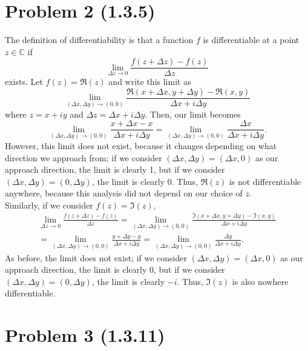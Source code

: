 \documentclass{article}
\begin{document}
\section{Problem 2 (1.3.5)} 
The definition of differentiability is that a function $f$ is differentiable at a point $z\in\mathbb{C}$ if 
\begin{equation*}
    \lim_{\Delta z \to 0}\frac{f(z+\Delta z)-f(z)}{\Delta z}
\end{equation*}
exists. Let $f(z)=\Re(z)$ and write this limit as 
\begin{equation*}
    \lim_{(\Delta x,\Delta y) \to (0,0)}\frac{\Re(x+\Delta x,y+\Delta y)-\Re(x,y)}{\Delta x + i \Delta y}
\end{equation*}
where $z=x+iy$ and $\Delta z= \Delta x+i\Delta y$. Then, our limit becomes
\begin{equation*}
    \lim_{(\Delta x,\Delta y) \to (0,0)}\frac{x+\Delta x-x}{\Delta x + i \Delta y} = \lim_{(\Delta x,\Delta y) \to (0,0)}\frac{\Delta x}{\Delta x + i \Delta y}.
\end{equation*}
However, this limit does not exist, because it changes depending on what direction we approach from; if we consider $(\Delta x,\Delta y)=(\Delta x, 0)$ as our approach direction, the limit is clearly 1, but if we consider $(\Delta x,\Delta y)=(0, \Delta y)$, the limit is clearly 0. Thus, $\Re(z)$ is not differentiable anywhere, because this analysis did not depend on our choice of $z$. \\
Similarly, if we consider $f(z)=\Im(z)$, 
\begin{equation*}
\begin{split}
    \lim_{\Delta z \to 0}\frac{f(z+\Delta z)-f(z)}{\Delta z} = \lim_{(\Delta x,\Delta y) \to (0,0)}\frac{\Im(x+\Delta x,y+\Delta y)-\Im(x,y)}{\Delta x + i \Delta y}\\=
    \lim_{(\Delta x,\Delta y) \to (0,0)}\frac{y+\Delta y-y}{\Delta x + i \Delta y} = \lim_{(\Delta x,\Delta y) \to (0,0)}\frac{\Delta y}{\Delta x + i \Delta y}.
\end{split}
\end{equation*}
As before, the limit does not exist; if we consider $(\Delta x,\Delta y)=(\Delta x, 0)$ as our approach direction, the limit is clearly 0, but if we consider $(\Delta x,\Delta y)=(0, \Delta y)$, the limit is clearly $-i$. Thus, $\Im(z)$ is also nowhere differentiable.
\section{Problem 3 (1.3.11)}
\end{document}
